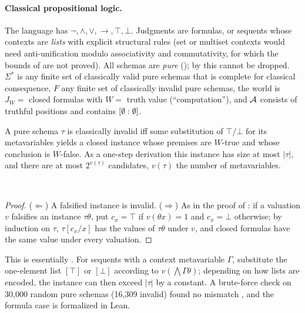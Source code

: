 \paragraph{Classical propositional logic.} The language has $\neg,\wedge,\vee,\to,\top,\bot$. Judgments are formulas, or sequents whose contexts are \emph{lists} with explicit structural rules (set or multiset contexts would need anti-unification modulo associativity and commutativity, for which the bounds of  are not proved). All schemas are \emph{pure} (); by  this cannot be dropped. $\Sigma^*$ is any finite set of classically valid pure schemas that is complete for classical consequence, $F$ any finite set of classically invalid pure schemas, the world is $J_W=$ closed formulas with $W=$ truth value (``computation''), and $\mathcal{A}$ consists of truthful positions and contains $[\emptyset : \emptyset]$.

\begin{lemma}\label{lem:twotier:post}
A pure schema $\tau$ is classically invalid iff some substitution of $\top/\bot$ for its metavariables yields a closed instance whose premises are $W$-true and whose conclusion is $W$-false. As a one-step derivation this instance has size at most $|\tau|$, and there are at most $2^{v(\tau)}$ candidates, $v(\tau)$ the number of metavariables.
\par\hfill{}\ 
\end{lemma}

\begin{proof}
($\Leftarrow$) A falsified instance is invalid. ($\Rightarrow$) As in the proof of : if a valuation $v$ falsifies an instance $\tau\theta$, put $c_x=\top$ if $v(\theta x)=1$ and $c_x=\bot$ otherwise; by induction on $\tau$, $\tau[c_x/x]$ has the values of $\tau\theta$ under $v$, and closed formulas have the same value under every valuation.
\end{proof}

This is essentially \citet{post1921}. For sequents with a context metavariable $\Gamma$, substitute the one-element list $[\top]$ or $[\bot]$ according to $v(\bigwedge\Gamma\theta)$; depending on how lists are encoded, the instance can then exceed $|\tau|$ by a constant. A brute-force check on 30{,}000 random pure schemas (16{,}309 invalid) found no mismatch , and the formula case is formalized in Lean.

